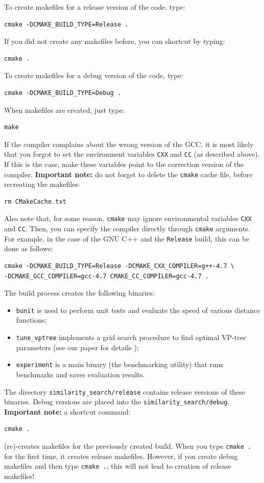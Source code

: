 \documentclass[runningheads,a4paper]{llncs}
\newcommand{\ttt}[1]{\texttt{#1}}
\begin{document}
{To create makefiles for a release version of the code, type:
\begin{verbatim}
cmake -DCMAKE_BUILD_TYPE=Release .
\end{verbatim}
If you did not create any makefiles before, you can shortcut by typing:
\begin{verbatim}
cmake . 
\end{verbatim}
To create makefiles for a debug version of the code, type:
\begin{verbatim}
cmake -DCMAKE_BUILD_TYPE=Debug .
\end{verbatim}
When makefiles are created, just type:
\begin{verbatim}
make
\end{verbatim}
If the compiler complains about the wrong version of the GCC, 
it is most likely that you forgot to set the environment variables \ttt{CXX} and \ttt{CC} (as described above).
If this is the case, make these variables point to the correction version of the compiler.
\textbf{Important note:} 
do not forget to delete the \ttt{cmake} cache file, before recreating the makefiles:
\begin{verbatim}
rm CMakeCache.txt
\end{verbatim}

Also note that, for some reason, \ttt{cmake} may ignore environmental variables \ttt{CXX} and \ttt{CC}.
Then, you can specify the compiler directly through \ttt{cmake} arguments.
For example, in the case of the GNU C++ and the \ttt{Release} build, 
this can be done as follows:
\begin{verbatim}
cmake -DCMAKE_BUILD_TYPE=Release -DCMAKE_CXX_COMPILER=g++-4.7 \
-DCMAKE_GCC_COMPILER=gcc-4.7 CMAKE_CC_COMPILER=gcc-4.7 .
\end{verbatim} 

The build process creates the following binaries:
\begin{itemize}
\item \ttt{bunit} is used to perform unit tests and 
evaluate the speed of various distance functions;
\item \ttt{tune\_vptree} implements a grid search procedure to find optimal VP-tree parameters (see our paper for details \cite{Boytsov_and_Bilegsaikhan:nips2013});
\item \ttt{experiment} is a main binary (the benchmarking utility) that runs benchmarks and saves evaluation results.
\end{itemize}

The directory \ttt{similarity\_search/release} contains release versions of
these binaries. Debug versions are placed into the \ttt{similarity\_search/debug}.
\textbf{Important note:} a shortcut command:
\begin{verbatim}
cmake .
\end{verbatim} 
(re)-creates makefiles for the previously 
created build. When you type \ttt{cmake .} for the first time,
it creates release makefiles. However, if you create debug
makefiles and then type \ttt{cmake .}, 
this will not lead to creation of release makefiles! 

}
\end{document}
